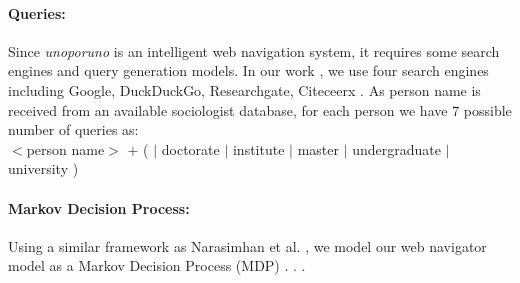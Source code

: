 \paragraph{Queries: }  Since \textit{unoporuno} is an intelligent web navigation system, it requires some search engines and query generation models. In our work , we use four search engines including Google, DuckDuckGo, Researchgate, Citeceerx  . As person name is received from an available sociologist database, for each person we have $7$ possible number of queries as: \\

$<$person name$>$ $+$ (  $|$ doctorate $|$ institute $|$ master $|$ undergraduate $|$ university ) 

\paragraph{Markov Decision Process: } Using a similar framework as Narasimhan et al. , we model our web navigator model as a Markov Decision Process (MDP) \cite{puterman1994}. . .

